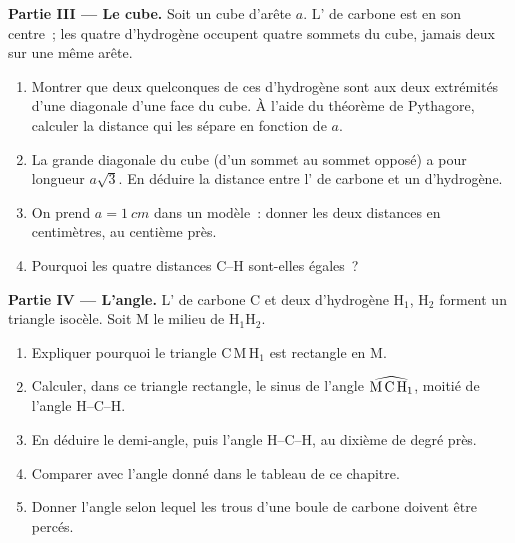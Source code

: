 \begin{problem}
\medskip
\noindent\textbf{Partie III --- Le cube.}
Soit un cube d'arête $a$. L' de carbone est en son centre~; les
quatre  d'hydrogène occupent quatre sommets du cube, jamais deux
sur une même arête.
\begin{enumerate}[resume]
  \item Montrer que deux quelconques de ces  d'hydrogène sont aux
        deux extrémités d'une diagonale d'une face du cube. À l'aide du
        théorème de Pythagore, calculer la distance qui les sépare en
        fonction de $a$.
  \item La grande diagonale du cube (d'un sommet au sommet opposé) a
        pour longueur $a\sqrt{3}$. En déduire la distance entre l' de
        carbone et un  d'hydrogène.
  \item On prend $a = \qty{1}{cm}$ dans un modèle~: donner les deux
        distances en centimètres, au centième près.
  \item Pourquoi les quatre distances C--H sont-elles égales~?
\end{enumerate}

\medskip
\noindent\textbf{Partie IV --- L'angle.}
L' de carbone C et deux  d'hydrogène H$_1$, H$_2$ forment un
triangle isocèle. Soit M le milieu de H$_1$H$_2$.
\begin{enumerate}[resume]
  \item Expliquer pourquoi le triangle C\,M\,H$_1$ est rectangle en M.
  \item Calculer, dans ce triangle rectangle, le sinus de l'angle
        $\widehat{\text{M\,C\,H}_1}$, moitié de l'angle H--C--H.
  \item En déduire le demi-angle, puis l'angle H--C--H, au dixième de
        degré près.
  \item Comparer avec l'angle donné dans le tableau de ce chapitre.
  \item Donner l'angle selon lequel les trous d'une boule de carbone
        doivent être percés.
\end{enumerate}
\end{problem}
